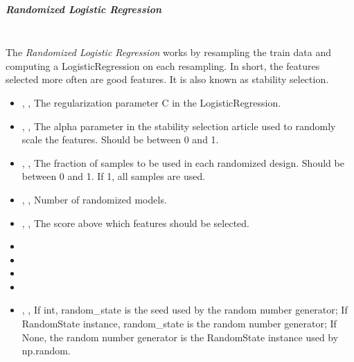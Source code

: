 \subparagraph{Randomized Logistic Regression}
\mbox{}
\\The \textit{Randomized Logistic Regression} works by resampling the train data
and computing a LogisticRegression on each resampling.
%
In short, the features selected more often are good features.
%
It is also known as stability selection.
%
\begin{itemize}
  \item {} , ,
  The regularization parameter C in the LogisticRegression.
  \item {} , ,
  The alpha parameter in the stability selection article used to randomly scale
  the features.
  Should be between 0 and 1.
  \item {} , ,
  The fraction of samples to be used in each randomized design.
  Should be between 0 and 1.
  If 1, all samples are used.
  \item {} , ,
  Number of randomized models.
  \item {} , ,
  The score above which features should be selected.
  \item {}
  \item \verDescriptionB
  \item {}
  \item \tolDescriptionC{}
  \item {} , ,
  If int, random\_state is the seed used by the random number
  generator; If RandomState instance, random\_state is the random
  number generator; If None, the random number generator is the RandomState
  instance used by np.random.
\end{itemize}

